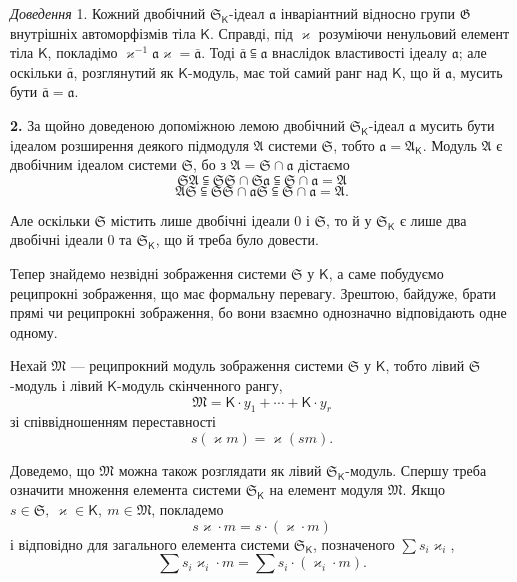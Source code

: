 \documentclass[11pt]{article}
\begin{document}
\emph{Доведення} 1. Кожний двобічний \(\mathfrak S_{\mathsf K}\)-ідеал \(\mathfrak a\) інваріантний відносно групи \(\mathfrak G\) внутрішніх автоморфізмів тіла \(\mathsf K\). Справді, під \(\varkappa\) розуміючи ненульовий елемент тіла \(\mathsf K\), покладімо \(\varkappa^{-1}\mathfrak a\varkappa=\bar{\mathfrak a}\). Тоді \(\bar{\mathfrak a}\subseteqq\mathfrak a\) внаслідок властивості ідеалу \(\mathfrak a\); але оскільки \(\bar{\mathfrak a}\), розглянутий як \(\mathsf K\)-модуль, має той самий ранг над \(\mathsf K\), що й \(\mathfrak a\), мусить бути \(\bar{\mathfrak a}=\mathfrak a\).

\textbf{2.} За щойно доведеною допоміжною лемою двобічний \(\mathfrak S_{\mathsf K}\)-ідеал \(\mathfrak a\) мусить бути ідеалом розширення деякого підмодуля \(\mathfrak A\) системи \(\mathfrak S\), тобто \(\mathfrak a=\mathfrak A_{\mathsf K}\). Модуль \(\mathfrak A\) є двобічним ідеалом системи \(\mathfrak S\), бо з \(\mathfrak A=\mathfrak S\cap\mathfrak a\) дістаємо
\[
\mathfrak S\mathfrak A\subseteqq\mathfrak S\mathfrak S\cap\mathfrak S\mathfrak a\subseteqq\mathfrak S\cap\mathfrak a=\mathfrak A
\]
\[
\mathfrak A\mathfrak S\subseteqq\mathfrak S\mathfrak S\cap\mathfrak a\mathfrak S\subseteqq\mathfrak S\cap\mathfrak a=\mathfrak A.
\]

Але оскільки \(\mathfrak S\) містить лише двобічні ідеали 0 і \(\mathfrak S\), то й у \(\mathfrak S_{\mathsf K}\) є лише два двобічні ідеали 0 та \(\mathfrak S_{\mathsf K}\), що й треба було довести.

Тепер знайдемо незвідні зображення системи \(\mathfrak S\) у \(\mathsf K\), а саме побудуємо реципрокні зображення, що має формальну перевагу. Зрештою, байдуже, брати прямі чи реципрокні зображення, бо вони взаємно однозначно відповідають одне одному.

Нехай \(\mathfrak M\) --- реципрокний модуль зображення системи \(\mathfrak S\) у \(\mathsf K\), тобто лівий \(\mathfrak S\)-модуль і лівий \(\mathsf K\)-модуль скінченного рангу,
\[
\mathfrak M=\mathsf K\cdot y_1+\cdots+\mathsf K\cdot y_r
\]
зі співвідношенням переставності
\[
s(\varkappa m)=\varkappa (sm).
\]

Доведемо, що \(\mathfrak M\) можна також розглядати як лівий \(\mathfrak S_{\mathsf K}\)-модуль. Спершу треба означити множення елемента системи \(\mathfrak S_{\mathsf K}\) на елемент модуля \(\mathfrak M\). Якщо \(s\in\mathfrak S,\ \varkappa \in\mathsf K,\ m\in\mathfrak M\), покладемо
\[
s\varkappa \cdot m=s\cdot(\varkappa \cdot m)
\]
і відповідно для загального елемента системи \(\mathfrak S_{\mathsf K}\), позначеного \(\sum s_i\varkappa _i\),
\[
\sum s_i\varkappa _i\cdot m=\sum s_i\cdot(\varkappa _i\cdot m).
\]
\end{document}
